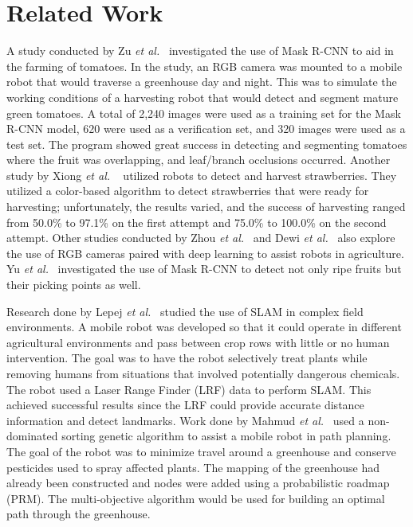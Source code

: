 \documentclass[12pt]{article}
\begin{document}
\section{Related Work}
A study conducted by Zu \emph{et al.}~\cite{zu2021detection} investigated the use of Mask R-CNN to aid in the farming of tomatoes. In the study, an RGB camera was mounted to a mobile robot that would traverse a greenhouse day and night. This was to simulate the working conditions of a harvesting robot that would detect and segment mature green tomatoes. A total of 2,240 images were used as a training set for the Mask R-CNN model, 620 were used as a verification set, and 320 images were used as a test set. The program showed great success in detecting and segmenting tomatoes where the fruit was overlapping, and leaf/branch occlusions occurred. Another study by Xiong \emph{et al. }~\cite{xiong2020autonomous} utilized robots to detect and harvest strawberries. They utilized a color-based algorithm to detect strawberries that were ready for harvesting; unfortunately, the results varied, and the success of harvesting ranged from 50.0\% to 97.1\% on the first attempt and 75.0\% to 100.0\% on the second attempt. Other studies conducted by Zhou \emph{et al.}~\cite{zhou2022intelligent} and Dewi \emph{et al.}~\cite{dewi2021blob} also explore the use of RGB cameras paired with deep learning to assist robots in agriculture. Yu \emph{et al.}~\cite{yu2019fruit} investigated the use of Mask R-CNN to detect not only ripe fruits but their picking points as well.

Research done by Lepej \emph{et al.}~\cite{LEPEJ2016160} studied the use of SLAM in complex field environments. A mobile robot was developed so that it could operate in different agricultural environments and pass between crop rows with little or no human intervention. The goal was to have the robot selectively treat plants while removing humans from situations that involved potentially dangerous chemicals. The robot used a Laser Range Finder (LRF) data to perform SLAM. This achieved successful results since the LRF could provide accurate distance information and detect landmarks. Work done by Mahmud \emph{et al.}~\cite{MAHMUD2019488} used a non-dominated sorting genetic algorithm to assist a mobile robot in path planning. The goal of the robot was to minimize travel around a greenhouse and conserve pesticides used to spray affected plants. The mapping of the greenhouse had already been constructed and nodes were added using a probabilistic roadmap (PRM). The multi-objective algorithm would be used for building an optimal path through the greenhouse.
\end{document}
